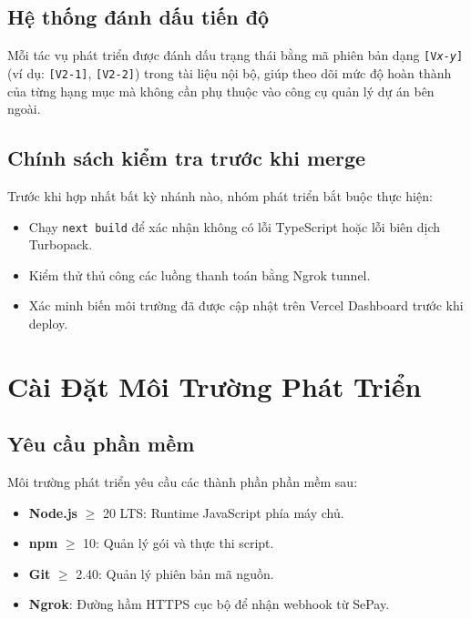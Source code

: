 \documentclass[14pt,a4paper]{report}
\begin{document}
\subsection{Hệ thống đánh dấu tiến độ}

Mỗi tác vụ phát triển được đánh dấu trạng thái bằng mã phiên bản
dạng \texttt{[V\textit{x}-\textit{y}]} (ví dụ: \texttt{[V2-1]},
\texttt{[V2-2]}) trong tài liệu nội bộ, giúp theo dõi mức độ hoàn
thành của từng hạng mục mà không cần phụ thuộc vào công cụ quản lý
dự án bên ngoài.

\subsection{Chính sách kiểm tra trước khi merge}

Trước khi hợp nhất bất kỳ nhánh nào, nhóm phát triển bắt buộc thực
hiện:

\begin{itemize}
    \item Chạy \texttt{next build} để xác nhận không có lỗi TypeScript
          hoặc lỗi biên dịch Turbopack.
    \item Kiểm thử thủ công các luồng thanh toán bằng Ngrok tunnel.
    \item Xác minh biến môi trường đã được cập nhật trên Vercel
          Dashboard trước khi deploy.
\end{itemize}

\section{Cài Đặt Môi Trường Phát Triển}

\subsection{Yêu cầu phần mềm}

Môi trường phát triển yêu cầu các thành phần phần mềm sau:

\begin{itemize}
    \item \textbf{Node.js} $\geq$ 20 LTS: Runtime JavaScript phía máy chủ.
    \item \textbf{npm} $\geq$ 10: Quản lý gói và thực thi script.
    \item \textbf{Git} $\geq$ 2.40: Quản lý phiên bản mã nguồn.
    \item \textbf{Ngrok}: Đường hầm HTTPS cục bộ để nhận webhook từ SePay.
\end{itemize}
\end{document}
